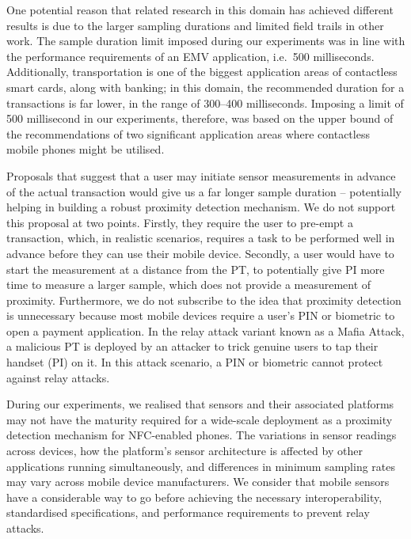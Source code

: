 \documentclass{article}
\begin{document}
One potential reason that related research in this domain has achieved different results is due to the larger sampling durations and limited field trails in other work.  The sample duration limit imposed during our experiments was in line with the performance requirements of an EMV application, i.e.\ 500 milliseconds.  Additionally, transportation is one of the biggest application areas of contactless smart cards, along with banking; in this domain, the recommended duration for a transactions is far lower, in the range of 300--400 milliseconds.  Imposing a limit of 500 millisecond in our experiments, therefore, was based on the upper bound of the recommendations of two significant application areas where contactless mobile phones might be utilised. 

Proposals that suggest that a user may initiate sensor measurements in advance of the actual transaction would give us a far longer sample duration -- potentially helping in building a robust proximity detection mechanism.  We do not support this proposal at two points. Firstly, they require the user to pre-empt a transaction, which, in realistic scenarios, requires a task to be performed well in advance before they can use their mobile device.  Secondly, a user would have to start the measurement at a distance from the PT, to potentially give PI more time to measure a larger sample, which does not provide a measurement of proximity.  Furthermore, we do not subscribe to the idea that proximity detection is unnecessary because most mobile devices require a user's PIN or biometric to open a payment application.  In the relay attack variant known as a Mafia Attack, a malicious PT is deployed by an attacker to trick genuine users to tap their handset (PI) on it.  In this attack scenario, a PIN or biometric cannot protect against relay attacks.

During our experiments, we realised that sensors and their associated platforms may not have the maturity required for a wide-scale deployment as a proximity detection mechanism for NFC-enabled phones.  The variations in sensor readings across devices, how the platform's sensor architecture is affected by other applications running simultaneously, and differences in minimum sampling rates may vary across mobile device manufacturers.  We consider that mobile sensors have a considerable way to go before achieving the necessary interoperability, standardised specifications, and performance requirements to prevent relay attacks.
\end{document}
